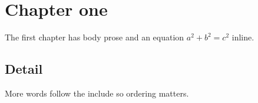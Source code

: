 \section{Chapter one}
The first chapter has body prose and an equation $a^2 + b^2 = c^2$ inline.


\subsection{Detail}
More words follow the include so ordering matters.
